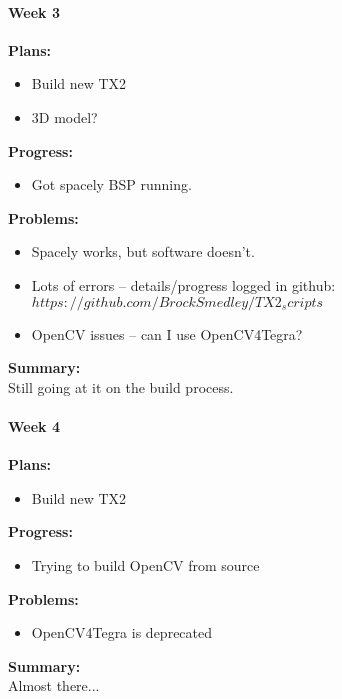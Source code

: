 \paragraph{Week 3}
\begin{adjustwidth}{2.5em}{0pt}
    \vspace{-0.5cm}\textbf{Plans:}
    \vspace{-0.5cm}
    \begin{itemize}
        \item Build new TX2
        \item 3D model?
    \end{itemize} 
    \vspace{-0.3cm}\textbf{Progress:}
    \vspace{-0.5cm}
    \begin{itemize}
        \item  Got spacely BSP running.
    \end{itemize} 
    \vspace{-0.3cm}\textbf{Problems:}
    \vspace{-0.5cm}
    \begin{itemize}
        \item Spacely works, but software doesn't.
        \item Lots of errors -- details/progress logged in github: $https://github.com/BrockSmedley/TX2_scripts$
        \item OpenCV issues -- can I use OpenCV4Tegra?
    \end{itemize}  
    \vspace{-0.3cm}\noindent\textbf{Summary:}\\
    \noindent 
    Still going at it on the build process.
\end{adjustwidth} 

\paragraph{Week 4}
\begin{adjustwidth}{2.5em}{0pt}
    \vspace{-0.5cm}\textbf{Plans:}
    \vspace{-0.5cm}
    \begin{itemize}
        \item Build new TX2
    \end{itemize} 
    \vspace{-0.3cm}\textbf{Progress:}
    \vspace{-0.5cm}
    \begin{itemize}
        \item Trying to build OpenCV from source
    \end{itemize} 
    \vspace{-0.3cm}\textbf{Problems:}
    \vspace{-0.5cm}
    \begin{itemize}
        \item OpenCV4Tegra is deprecated
    \end{itemize}  
    \vspace{-0.3cm}\noindent\textbf{Summary:}\\
    \noindent 
    Almost there...
\end{adjustwidth} 

